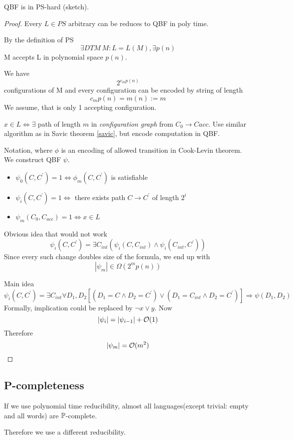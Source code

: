 \begin{theorem}
	QBF is in PS-hard (sketch).
\end{theorem}
\begin{proof}
	Every $L \in PS$ arbitrary can be reduces to QBF in poly time.

	By the definition of PS
	\[ \exists DTM\ M: L = L(M), \exists p(n) \]
	M accepts L in polynomial space $p(n)$.

	We have \[ 2^{c_m p(n)} \] configurations of M and every configuration can be encoded by string of length
	\[ c_m p(n) = m(n) := m \]
	We assume, that is only 1 accepting configuration.

	$x \in L \iff \exists $ path of length $m$ in \emph{configuration graph} from $C_0 \to C{acc}$.
	Use similar algorithm as in Savic theorem \cref{savic}, but encode computation in QBF.

	Notation, where $\phi$ is an encoding of allowed transition in Cook-Levin theorem.
	We construct QBF $\psi$.
	\begin{itemize}
		\item $ \psi_0(C, C^{\prime}) = 1 \iff \phi_m(C, C^{\prime})$ is satisfiable
		\item $ \psi_i(C, C^{\prime}) = 1 \iff $ there exists path $C \to C^{\prime}$ of length $2^i$
		\item $ \psi_m(C_0, C_{acc}) = 1 \iff x \in L$
	\end{itemize}

	Obvious idea that would not work
	\[ \psi_i(C, C^{\prime}) = \exists C_{int} (\psi_i(C, C_{int}) \land \psi_i(C_{int}, C^{\prime})) \]
	Since every such change doubles size of the formula, we end up with
	\[ |\psi_m| \in \Omega(2^m p(n)) \]

	Main idea
	\[ \psi_i(C, C^{\prime}) = \exists C_{int} \forall D_1, D_2 [(D_1 = C \land D_2 = C^{\prime}) \lor (D_1 = C_{int} \land D_2 = C^{\prime})] \Rightarrow \psi(D_1, D_2) \]
	Formally, implication could be replaced by $\neg x \lor y$.
	Now
	\[ |\psi_i| = |\psi_{i - 1}| + \mathcal{O}(1) \]
	Therefore
	\[ |\psi_m| = \mathcal{O}(m^2) \]
\end{proof}

\subsection{P-completeness}

\begin{note}
	If we use polynomial time reducibility, almost all languages(except trivial: empty and all words) are $\operatorname{\mathbb{P}}$-complete.

	Therefore we use a different reducibility.
\end{note}


